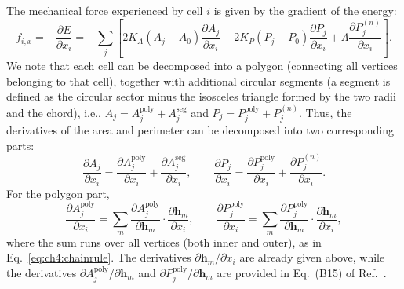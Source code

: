 The mechanical force experienced by cell $i$ is given by the gradient of the energy:
\begin{equation}
    f_{i,x}=-\frac{\partial E}{\partial x_i}=-\sum_j\left[2K_A(A_j-A_0)\frac{\partial A_j}{\partial x_i}+2K_P(P_j-P_0)\frac{\partial P_j}{\partial x_i} + \Lambda\frac{\partial P_j^{(n)}}{\partial x_i}\right].
\end{equation}
We note that each cell can be decomposed into a polygon (connecting all vertices belonging to that cell), together with additional circular segments (a segment is defined as the circular sector minus the isosceles triangle formed by the two radii and the chord), i.e., $A_j=A_j^\textrm{poly}+A_j^\textrm{seg}$ and $P_j=P_j^\textrm{poly}+P_j^{(n)}$.
Thus, the derivatives of the area and perimeter can be decomposed into two corresponding parts:
\begin{equation}
    \frac{\partial A_j}{\partial x_i}=\frac{\partial A_j^\textrm{poly}}{\partial x_i}+\frac{\partial A_j^\textrm{seg}}{\partial x_i},\qquad\frac{\partial P_j}{\partial x_i}=\frac{\partial P_j^\textrm{poly}}{\partial x_i}+\frac{\partial P_j^{(n)}}{\partial x_i}.
\end{equation}
For the polygon part,
\begin{equation}
    \frac{\partial A_j^\textrm{poly}}{\partial x_i} = \sum_m\frac{\partial A_j^\textrm{poly}}{\partial \mathbf{h}_m}\cdot\frac{\partial \mathbf{h}_m}{\partial x_i},\qquad\frac{\partial P_j^\textrm{poly}}{\partial x_i} = \sum_m\frac{\partial P_j^\textrm{poly}}{\partial \mathbf{h}_m}\cdot\frac{\partial \mathbf{h}_m}{\partial x_i},
\end{equation}
where the sum runs over all vertices (both inner and outer), as in Eq.~\eqref{eq:ch4:chainrule}. The derivatives $\partial\mathbf{h}_m/\partial x_i$ are already given above, while the derivatives ${\partial A_j^\textrm{poly}}/{\partial \mathbf{h}_m}$ and ${\partial P_j^\textrm{poly}}/{\partial \mathbf{h}_m}$ are provided in Eq.~(B15) of Ref.~\cite{teomy2018confluent}.

